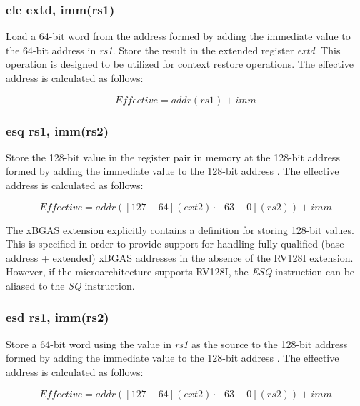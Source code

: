 \documentclass{article}
\begin{document}
\subsubsection{ele extd, imm(rs1)}
Load a 64-bit word from the address formed by adding the immediate value to the 
64-bit address in \textit{rs1}.  Store the result in the extended register \textit{extd}.  
This operation is designed to be utilized for context restore operations.  The effective 
address is calculated as follows: 

\begin{equation}
Effective = addr(rs1)+imm
\end{equation}

\subsubsection{esq rs1, imm(rs2)}
Store the 128-bit value in the register pair  in memory at the 128-bit address formed by adding the immediate value to 
the 128-bit address .  The effective address is calculated 
as follows:  

\begin{equation}
Effective = addr([127-64](ext2) \cdot [63-0](rs2))+imm
\end{equation}

\begin{commentary}
The xBGAS extension explicitly contains a definition for storing 128-bit values.  
This is specified in order to provide support for handling fully-qualified (base 
address + extended) xBGAS addresses in the absence of the RV128I extension.  However, 
if the microarchitecture supports RV128I, the \textit{ESQ} instruction can be aliased 
to the \textit{SQ} instruction.
\end{commentary}

\subsubsection{esd rs1, imm(rs2)}
Store a 64-bit word using the value in \textit{rs1} as the source 
to the 128-bit address formed by adding the immediate value to the 
128-bit address .  The effective address is calculated 
as follows: 

\begin{equation}
Effective = addr([127-64](ext2) \cdot [63-0](rs2))+imm
\end{equation}
\end{document}
